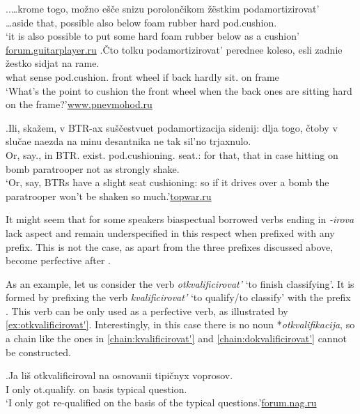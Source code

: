 \ex.\label{ex:cushion}\ag.\label{ex:cushion1}…krome togo, mo\v{z}no e\v{s}\v{c}e snizu porolon\v{c}ikom \v{z}\"{e}stkim podamortizirovat'\textsuperscript{\PF}\\		
…aside that, possible also below {foam rubber} hard pod.cushion.\\
\trans `it is also possible to put some hard foam rubber below as a cushion'\\\hbox{}\hfill\hbox{\url{forum.guitarplayer.ru}}
\bg.\label{ex:cushion2}\v{C}to tolku podamortizirovat'\textsuperscript{\IPF} perednee koleso, esli zadnie \v{z}estko sidjat na rame.\\
what sense pod.cushion. front wheel if back hardly sit. on frame\\
\trans `What's the point to cushion the front wheel when the back ones are sitting hard on the frame?'\hbox{}\hfill\hbox{\url{www.pnevmohod.ru}}

\exg.\label{ex:podamortizacija}Ili, ska\v{z}em, v BTR-ax su\v{s}\v{c}estvuet podamortizacija sidenij: dlja togo, \v{c}toby v slu\v{c}ae naezda na minu desantnika ne tak sil'no trjaxnulo.\\
Or, say., in BTR. exist. pod.cushioning. seat.: for that, that in case hitting on bomb paratrooper not as strongly shake.\\
\trans `Or, say, BTRs have a slight seat cushioning: so if it drives over a bomb the paratrooper won't be shaken so much.'\hbox{}\hfill\hbox{\url{topwar.ru}}

It might seem that for some speakers biaspectual borrowed verbs ending in \mbox{\textit{-irova}} lack aspect and remain underspecified in this respect when prefixed with any prefix. This is not the case, as apart from the three prefixes discussed above,  become perfective after . 

As an example, let us consider the verb \textit{otkvalificirovat'} `to finish classifying'. It is formed by prefixing the verb \textit{kvalificirovat'} `to qualify/to classify' with the  prefix . This verb can be only used as a perfective verb, as illustrated by \ref{ex:otkvalificirovat'}. Interestingly, in this case there is no noun *\textit{otkvalifikacija}, so a chain like the ones in \ref{chain:kvalificirovat'} and \ref{chain:dokvalificirovat'} cannot be constructed. 

\exg.\label{ex:otkvalificirovat'}Ja li\v{s} otkvalificiroval na osnovanii tipi\v{c}nyx voprosov.\\
I only ot.qualify. on basis typical question.\\
\trans `I only got re-qualified on the basis of the typical questions.'\hbox{}\hfill\hbox{\url{forum.nag.ru}}

